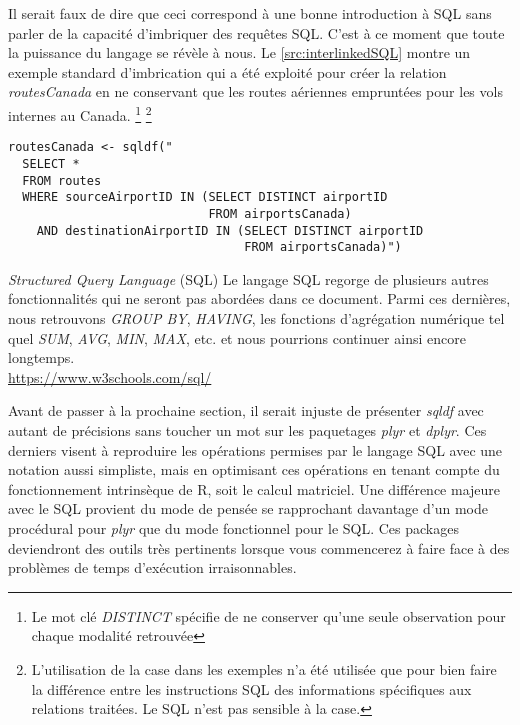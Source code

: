 \vspace{\baselineskip}
Il serait faux de dire que ceci correspond à une bonne introduction à SQL sans parler de la capacité d'imbriquer des requêtes SQL. C'est à ce moment que toute la puissance du langage se révèle à nous. Le \autoref{src:interlinkedSQL} montre un exemple standard d'imbrication qui a été exploité pour créer la relation \emph{routesCanada} en ne conservant que les routes aériennes empruntées pour les vols internes au Canada. \footnote{Le mot clé \emph{DISTINCT} spécifie de ne conserver qu'une seule observation pour chaque modalité retrouvée} \footnote{L'utilisation de la case dans les exemples n'a été utilisée que pour bien faire la différence entre les instructions SQL des informations spécifiques aux relations traitées. Le SQL n'est pas sensible à la case.}

\begin{lstlisting}[caption = Fonctionnalités avancées de SQL,label=src:interlinkedSQL]
routesCanada <- sqldf("
  SELECT *
  FROM routes
  WHERE sourceAirportID IN (SELECT DISTINCT airportID
                            FROM airportsCanada)
    AND destinationAirportID IN (SELECT DISTINCT airportID
                                 FROM airportsCanada)")                           
\end{lstlisting}

\begin{moreInfo}{\emph{Structured Query Language} (SQL)}
	Le langage SQL regorge de plusieurs autres fonctionnalités qui ne seront pas abordées dans ce document. Parmi ces dernières, nous retrouvons \emph{GROUP BY}, \emph{HAVING}, les fonctions d'agrégation numérique tel quel \emph{SUM}, \emph{AVG}, \emph{MIN}, \emph{MAX}, etc. et nous pourrions continuer ainsi encore longtemps. \\
	\url{https://www.w3schools.com/sql/}
\end{moreInfo}

Avant de passer à la prochaine section, il serait injuste de présenter \emph{sqldf} avec autant de précisions sans toucher un mot sur les paquetages \emph{plyr} et \emph{dplyr}. Ces derniers visent à reproduire les opérations permises par le langage SQL avec une notation aussi simpliste, mais en optimisant ces opérations en tenant compte du fonctionnement intrinsèque de R, soit le calcul matriciel. Une différence majeure avec le SQL provient du mode de pensée se rapprochant davantage d'un mode procédural pour \emph{plyr} que du mode fonctionnel pour le SQL. Ces packages deviendront des outils très pertinents lorsque vous commencerez à faire face à des problèmes de temps d'exécution irraisonnables.

